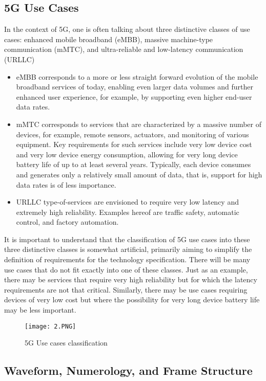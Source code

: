 \subsection{5G Use Cases}
In the context of 5G, one is often talking about three distinctive classes of use cases: enhanced mobile broadband (eMBB), massive machine-type communication (mMTC), and ultra-reliable and low-latency communication (URLLC) 
\begin{itemize}
    \item eMBB corresponds to a more or less straight forward evolution of the mobile broadband services of today, enabling even larger data volumes and further enhanced user experience, for example, by supporting even higher end-user data rates.
    \item mMTC corresponds to services that are characterized by a massive number of devices, for example, remote sensors, actuators, and monitoring of various equipment. Key requirements for such services include very low device cost and very low device energy consumption, allowing for very long device battery life of up to at least several years. Typically, each device consumes and generates only a relatively small amount of data, that is, support for high data rates is of less importance.
    \item URLLC type-of-services are envisioned to require very low latency and extremely high reliability. Examples hereof are traffic safety, automatic control, and factory automation. 
\end{itemize}
It is important to understand that the classification of 5G use cases into these three distinctive classes is somewhat artificial, primarily aiming to simplify the definition of requirements for the technology specification. There will be many use cases that do not fit exactly into one of these classes. Just as an example, there may be services that require very high reliability but for which the latency requirements are not that critical. Similarly, there may be use cases requiring devices of very low cost but where the possibility for very long device battery life may be less important.

\begin{figure}[h]
\centering
\texttt{[image: 2.PNG]}
\caption{5G Use cases classification}
\end{figure}

\subsection{Waveform, Numerology, and Frame Structure}

